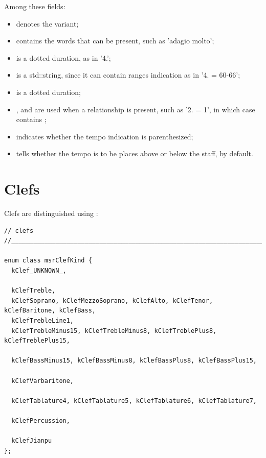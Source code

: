 Among these fields:
\begin{itemize}
\item {} denotes the variant;
\item {} contains the words that can be present, such as 'adagio molto';
\item {} is a dotted duration, as in '4.';
\item {} is a std::string, since it can contain ranges indication as in '4. = 60-66';
\item {} is a dotted duration; %
\item {},  and  are used when a relationship is present, such as '2. = 1', in which case  contains ;
\item {} indicates whether the tempo indication is parenthesized;
\item {} tells whether the tempo is to be places above or below the staff,  by default.
\end{itemize}


\section{Clefs}\label{Clefs}

Clefs are distinguished using :
\begin{lstlisting}[language=CPlusPlus]
// clefs
//______________________________________________________________________________

enum class msrClefKind {
  kClef_UNKNOWN_,

  kClefTreble,
  kClefSoprano, kClefMezzoSoprano, kClefAlto, kClefTenor, kClefBaritone, kClefBass,
  kClefTrebleLine1,
  kClefTrebleMinus15, kClefTrebleMinus8, kClefTreblePlus8, kClefTreblePlus15,

  kClefBassMinus15, kClefBassMinus8, kClefBassPlus8, kClefBassPlus15,

  kClefVarbaritone,

  kClefTablature4, kClefTablature5, kClefTablature6, kClefTablature7,

  kClefPercussion,

  kClefJianpu
};
\end{lstlisting}

